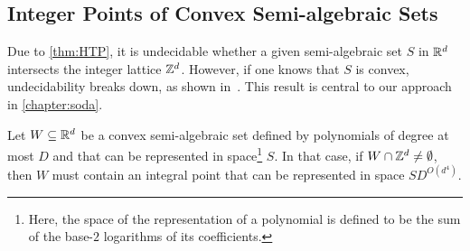 \subsection{Integer Points of Convex Semi-algebraic Sets}

Due to \cref{thm:HTP}, it is undecidable whether a given semi-algebraic set $S$ in $\mathbb{R}^{d}$ intersects the integer lattice $\mathbb{Z}^{d}$. However, if one knows that $S$ is convex, undecidability breaks down, as shown in~\cite{KhachiyanP97}. This result is central to our approach in \cref{chapter:soda}.

\begin{theorem}
\label{thm:kp}
Let $W\subseteq\mathbb{R}^{d}$ be a convex semi-algebraic set defined by
polynomials of degree at most $D$ and that can be represented in space\footnote{Here, the space of the representation of a polynomial is defined to be the sum of the base-$2$ logarithms of its coefficients.}
$S$. In that case, if $W\cap\mathbb{Z}^{d}\neq\emptyset$, then $W$ must
contain an integral point that can be represented in space
$SD^{O(d^4)}$.
\end{theorem}
